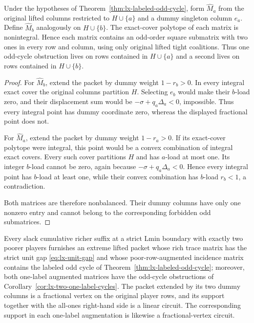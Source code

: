 \begin{corollary}
\label{cor:lx-two-one-label-cycles}
Under the hypotheses of Theorem~\ref{thm:lx-labeled-odd-cycle}, form
$\widehat M_a$ from the original lifted columns restricted to
$H\cup\{a\}$ and a dummy singleton column $e_a$.  Define
$\widehat M_b$ analogously on $H\cup\{b\}$.  The exact-cover polytope of
each matrix is nonintegral.  Hence each matrix contains an odd-order square
submatrix with two ones in every row and column, using only original lifted
tight coalitions.  Thus one odd-cycle obstruction lives on rows contained in
$H\cup\{a\}$ and a second lives on rows contained in $H\cup\{b\}$.
\end{corollary}

\begin{proof}
For $\widehat M_b$, extend the packet by dummy weight $1-r_b>0$.  In every
integral exact cover the original columns partition $H$.  Selecting $e_b$
would make their $b$-load zero, and their displacement sum would be
$-\sigma+q_a\Delta_a<0$, impossible.  Thus every integral point has dummy
coordinate zero, whereas the displayed fractional point does not.

For $\widehat M_a$, extend the packet by dummy weight $1-r_a>0$.  If its
exact-cover polytope were integral, this point would be a convex combination
of integral exact covers.  Every such cover partitions $H$ and has
$a$-load at most one.  Its integer $b$-load cannot be zero, again because
$-\sigma+q_a\Delta_a<0$.  Hence every integral point has $b$-load at least
one, while their convex combination has $b$-load $r_b<1$, a contradiction.

Both matrices are therefore nonbalanced.  Their dummy columns have only one
nonzero entry and cannot belong to the corresponding forbidden odd
submatrices.
\end{proof}

\begin{corollary}
\label{cor:lx-unconditional-labeled-obstruction}
Every slack cumulative richer suffix at a strict Lmin boundary with exactly
two poorer players furnishes an extreme lifted packet whose rich trace matrix
has the strict unit gap \eqref{eq:lx-unit-gap} and whose poor-row-augmented
incidence matrix contains the labeled odd cycle of
Theorem~\ref{thm:lx-labeled-odd-cycle}; moreover, both one-label augmented
matrices have the odd-cycle obstructions of
Corollary~\ref{cor:lx-two-one-label-cycles}.  The packet extended by its
two dummy columns is a fractional vertex on the original player rows, and
its support together with the all-ones right-hand side is a linear circuit.
The corresponding support in each one-label augmentation is likewise a
fractional-vertex circuit.
\end{corollary}

